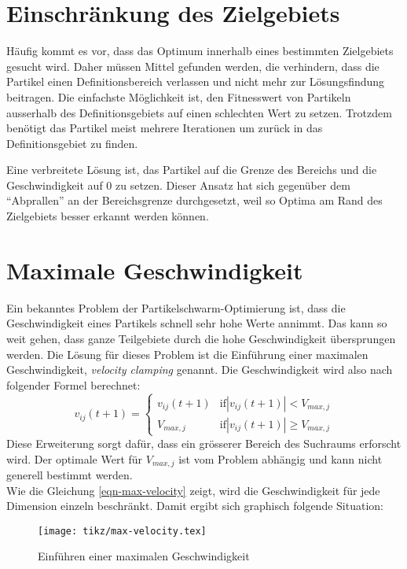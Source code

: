 \section{Einschränkung des Zielgebiets}
Häufig kommt es vor, dass das Optimum innerhalb eines bestimmten Zielgebiets gesucht wird. Daher müssen Mittel gefunden werden, die verhindern, dass die Partikel einen Definitionsbereich verlassen und nicht mehr zur Lösungsfindung beitragen. Die einfachste Möglichkeit ist, den Fitnesswert von Partikeln ausserhalb des Definitionsgebiets auf einen schlechten Wert zu setzen. Trotzdem benötigt das Partikel meist mehrere Iterationen um zurück in das Definitionsgebiet zu finden.

Eine verbreitete Lösung ist, das Partikel auf die Grenze des Bereichs und die Geschwindigkeit auf 0 zu setzen. Dieser Ansatz hat sich gegenüber dem ``Abprallen'' an der Bereichsgrenze durchgesetzt, weil so Optima am Rand des Zielgebiets besser erkannt werden können.

\section{Maximale Geschwindigkeit}
Ein bekanntes Problem der Partikelschwarm-Optimierung ist, dass die Geschwindigkeit eines Partikels schnell sehr hohe Werte annimmt. Das kann so weit gehen, dass ganze Teilgebiete durch die hohe Geschwindigkeit übersprungen werden. Die Lösung für dieses Problem ist die Einführung einer maximalen Geschwindigkeit, \textit{velocity clamping} genannt. Die Geschwindigkeit wird also nach folgender Formel berechnet:
\begin{equation}
	v_{ij}(t+1) = 
	\begin{cases}
		v_{ij}(t+1) & \text{if} |v_{ij}(t+1)| < V_{max,j} \\
		V_{max,j} & \text{if} |v_{ij}(t+1)| \geq V_{max,j}
	\end{cases}
	\label{eqn-max-velocity}
\end{equation}
Diese Erweiterung sorgt dafür, dass ein grösserer Bereich des Suchraums erforscht wird. Der optimale Wert für $V_{max,j}$ ist vom Problem abhängig und kann nicht generell bestimmt werden. \\

Wie die Gleichung \ref{eqn-max-velocity} zeigt, wird die Geschwindigkeit für jede Dimension einzeln beschränkt. Damit ergibt sich graphisch folgende Situation:

\begin{figure}[htbp]
	\centering
	\texttt{[image: tikz/max-velocity.tex]}
	\caption{Einführen einer maximalen Geschwindigkeit}
	\label{fig-max-velocity}
\end{figure}

